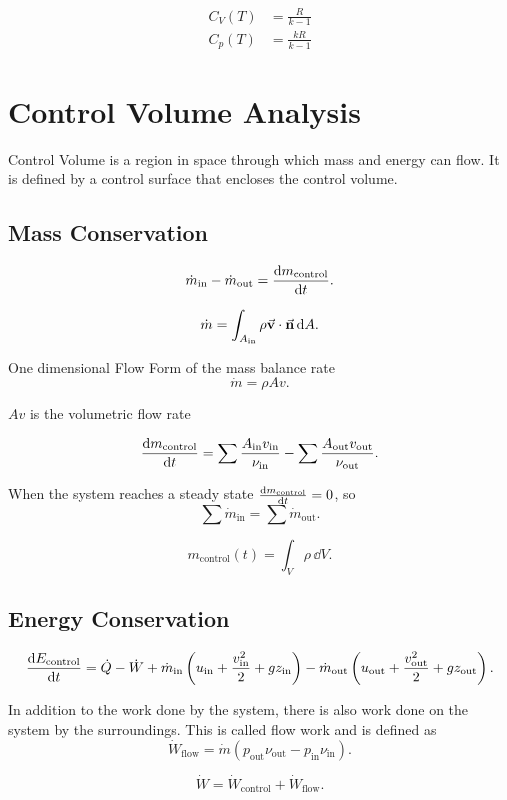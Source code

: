 \documentclass{report}
\begin{document}
\begin{align*}
	C_V(T) & =\frac{R}{k-1}  \\
	C_p(T) & =\frac{kR}{k-1}
\end{align*}

\chapter{Control Volume Analysis}

Control Volume is a region in space through which mass and energy can flow. It is defined by a control surface that encloses the control volume.

\section{Mass Conservation}

\[
	\dot{m}_\text{in} - \dot{m}_\text{out} = \dv{m_\text{control}}{t}
	.\]

\[
	\dot{m} = \int_{A_\text{in}}\rho\vec{\bm{\mathrm{v}}}\cdot\vec{\bm{\mathrm{n}}}\,\mathrm{d}A
	.\]

One dimensional Flow Form of the mass balance rate
\[
	\dot{m} = \rho A v
	.\]

$A v$ is the volumetric flow rate

\[
	\dv{m_\text{control}}{t} = \sum \frac{A_\text{in} v_\text{in}}{\nu_\text{in}} - \sum \frac{A_\text{out} v_\text{out}}{\nu_\text{out}}
	.\]

When the system reaches a steady state $\dv{m_\text{control}}{t} = 0$, so
\[
	\sum \dot{m}_\text{in} = \sum \dot{m}_\text{out}
	.\]

\[
	m_\text{control}(t) = \int_V \rho\,\dd{V}
	.\]

\section{Energy Conservation}

\[
	\dv{E_\text{control}}{t} = \dot{Q} - \dot{W} + \dot{m}_\text{in}\lt(u_\text{in} + \frac{v_\text{in}^2}{2} + gz_\text{in}\rt) - \dot{m}_\text{out}\lt(u_\text{out} + \frac{v_\text{out}^2}{2} + gz_\text{out}\rt)
	.\]

In addition to the work done by the system, there is also work done on the system by the surroundings. This is called flow work and is defined as
\[
	\dot{W}_\text{flow} = \dot{m}(p_\text{out}\nu_\text{out} - p_\text{in}\nu_\text{in})
	.\]

\[
	\dot{W} = \dot{W}_\text{control} + \dot{W}_\text{flow}
	.\]
\end{document}
